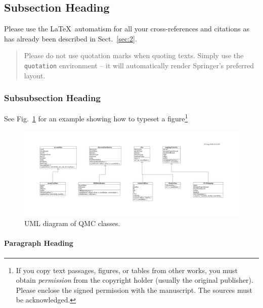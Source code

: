 \documentclass[graybox]{svmult}
\begin{document}
\subsection{Subsection Heading}
\label{subsec:2}

Please use the \LaTeX\ automatism for all your
cross-references and citations
as has already been described in Sect.~\ref{sec:2}.

\begin{quotation}
Please do not use quotation marks when quoting texts. Simply use the \verb|quotation| environment -- it will automatically render Springer's preferred layout.
\end{quotation}


\subsubsection{Subsubsection Heading}

See Fig.~\ref{fig:1} for an example showing how to typeset a figure\footnote{If you copy
text passages, figures, or tables from other works, you must obtain
\textit{permission} from the copyright holder (usually the original
publisher). Please enclose the signed permission with the manuscript. The
sources must be acknowledged.}

%
\begin{figure}[b]
\sidecaption
\includegraphics[scale=.31, angle =90]{QMC_UMLdiagram-2018_8_7}
%
%
\caption{UML diagram of QMC classes.}
\label{fig:1}       %
\end{figure}


\paragraph{Paragraph Heading} %
\end{document}
